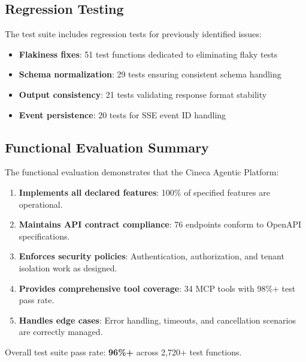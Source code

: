 \subsection{Regression Testing}

The test suite includes regression tests for previously identified issues:

\begin{itemize}
    \item \textbf{Flakiness fixes}: 51 test functions dedicated to eliminating flaky tests
    \item \textbf{Schema normalization}: 29 tests ensuring consistent schema handling
    \item \textbf{Output consistency}: 21 tests validating response format stability
    \item \textbf{Event persistence}: 20 tests for SSE event ID handling
\end{itemize}

\subsection{Functional Evaluation Summary}

The functional evaluation demonstrates that the Cineca Agentic Platform:

\begin{enumerate}
    \item \textbf{Implements all declared features}: 100\% of specified features are operational.
    
    \item \textbf{Maintains API contract compliance}: 76 endpoints conform to OpenAPI specifications.
    
    \item \textbf{Enforces security policies}: Authentication, authorization, and tenant isolation work as designed.
    
    \item \textbf{Provides comprehensive tool coverage}: 34 MCP tools with 98\%+ test pass rate.
    
    \item \textbf{Handles edge cases}: Error handling, timeouts, and cancellation scenarios are correctly managed.
\end{enumerate}

Overall test suite pass rate: \textbf{96\%+} across 2,720+ test functions.

